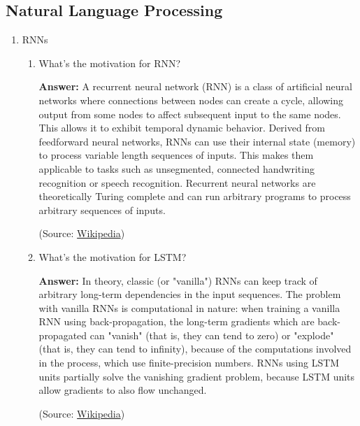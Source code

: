 \documentclass{article}
\newenvironment{QandA}{\begin{enumerate}[label=\arabic*.]}{\end{enumerate}}
\newenvironment{InnerQandA}{\begin{enumerate}[label=\roman*.]}{\end{enumerate}}
\newenvironment{answer}{\par\normalfont \textbf{Answer:}}{}
\begin{document}
\subsection{Natural Language Processing}
\begin{QandA}
    \item RNNs
    \begin{InnerQandA}
        \item What’s the motivation for RNN?
        \begin{answer}
            A recurrent neural network (RNN) is a class of artificial neural networks where connections between nodes can create a cycle, allowing output from some nodes to affect subsequent input to the same nodes. This allows it to exhibit temporal dynamic behavior. Derived from feedforward neural networks, RNNs can use their internal state (memory) to process variable length sequences of inputs. This makes them applicable to tasks such as unsegmented, connected handwriting recognition or speech recognition. Recurrent neural networks are theoretically Turing complete and can run arbitrary programs to process arbitrary sequences of inputs.

            (Source: \href{https://en.wikipedia.org/wiki/Recurrent_neural_network}{Wikipedia})
        \end{answer}
        
        \item What’s the motivation for LSTM?
        \begin{answer}
            In theory, classic (or "vanilla") RNNs can keep track of arbitrary long-term dependencies in the input sequences. The problem with vanilla RNNs is computational in nature: when training a vanilla RNN using back-propagation, the long-term gradients which are back-propagated can "vanish" (that is, they can tend to zero) or "explode" (that is, they can tend to infinity), because of the computations involved in the process, which use finite-precision numbers. RNNs using LSTM units partially solve the vanishing gradient problem, because LSTM units allow gradients to also flow unchanged. 

            (Source: \href{https://en.wikipedia.org/wiki/Long_short-term_memory}{Wikipedia})
        \end{answer}
        

\end{InnerQandA}
\end{QandA}
\end{document}
